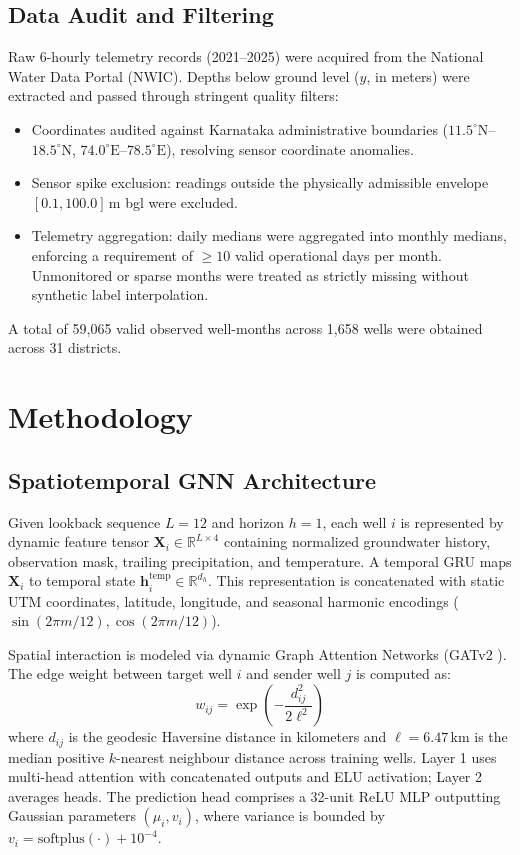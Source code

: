 \documentclass[10pt,journal,compsoc]{IEEEtran}
\begin{document}
\subsection{Data Audit and Filtering}
Raw 6-hourly telemetry records (2021--2025) were acquired from the National Water Data Portal (NWIC). Depths below ground level ($y$, in meters) were extracted and passed through stringent quality filters:
\begin{itemize}
    \item Coordinates audited against Karnataka administrative boundaries ($11.5^\circ\text{N}$--$18.5^\circ\text{N}$, $74.0^\circ\text{E}$--$78.5^\circ\text{E}$), resolving sensor coordinate anomalies.
    \item Sensor spike exclusion: readings outside the physically admissible envelope $[0.1, 100.0]$\,m bgl were excluded.
    \item Telemetry aggregation: daily medians were aggregated into monthly medians, enforcing a requirement of $\ge 10$ valid operational days per month. Unmonitored or sparse months were treated as strictly missing without synthetic label interpolation.
\end{itemize}
A total of 59,065 valid observed well-months across 1,658 wells were obtained across 31 districts.

\section{Methodology}
\subsection{Spatiotemporal GNN Architecture}
Given lookback sequence $L=12$ and horizon $h=1$, each well $i$ is represented by dynamic feature tensor $\mathbf{X}_i \in \mathbb{R}^{L \times 4}$ containing normalized groundwater history, observation mask, trailing precipitation, and temperature.
A temporal GRU maps $\mathbf{X}_i$ to temporal state $\mathbf{h}_i^{\text{temp}} \in \mathbb{R}^{d_h}$. This representation is concatenated with static UTM coordinates, latitude, longitude, and seasonal harmonic encodings ($\sin(2\pi m / 12), \cos(2\pi m / 12)$).

Spatial interaction is modeled via dynamic Graph Attention Networks (GATv2 \cite{brody2021how}). The edge weight between target well $i$ and sender well $j$ is computed as:
\begin{equation}
w_{ij} = \exp\left(-\frac{d_{ij}^2}{2\ell^2}\right)
\end{equation}
where $d_{ij}$ is the geodesic Haversine distance in kilometers and $\ell = 6.47$\,km is the median positive $k$-nearest neighbour distance across training wells. Layer 1 uses multi-head attention with concatenated outputs and ELU activation; Layer 2 averages heads. The prediction head comprises a 32-unit ReLU MLP outputting Gaussian parameters $(\mu_i, v_i)$, where variance is bounded by $v_i = \text{softplus}(\cdot) + 10^{-4}$.
\end{document}
